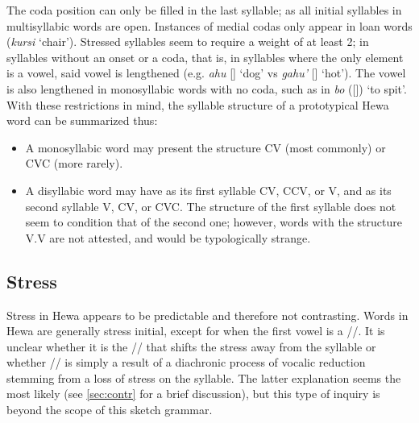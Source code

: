 \documentclass[../hewa_main-subfiles.tex]{subfiles}
\begin{document}
The coda position can only be filled in the last syllable; as all initial syllables in multisyllabic words are open. Instances of medial codas only appear in loan words (\textit{kursi} `chair'). Stressed syllables seem to require a weight of at least 2; in syllables without an onset or a coda, that is, in syllables where the only element is a vowel, said vowel is lengthened (e.g. \textit{ahu} [] `dog' vs \textit{gahu'} [] `hot'). The vowel is also lengthened in monosyllabic words with no coda, such as in  \textit{bo} ([]) `to spit'. With these restrictions in mind, the syllable structure of a prototypical Hewa word can be summarized thus:

\begin{itemize}

\item A monosyllabic word may present the structure CV\textipa{:} (most commonly) or CVC (more rarely).

\item A disyllabic word may have as its first syllable CV, CCV, or V\textlengthmark , and as its second syllable V, CV, or CVC. The structure of the first syllable does not seem to condition that of the second one; however, words with the structure V\textlengthmark .V are not attested, and would be typologically strange.

\end{itemize}

\subsection{Stress}\label{sec:str}


Stress in Hewa appears to be predictable and therefore not contrasting. Words in Hewa are generally stress initial, except for when the first vowel is a /\textschwa/. It is unclear whether it is the /\textschwa/ that shifts the stress away from the syllable or whether /\textschwa/ is simply a result of a diachronic process of vocalic reduction stemming from a loss of stress on the syllable. The latter explanation seems the most likely (see \ref{sec:contr} for a brief discussion), but this type of inquiry is beyond the scope of this sketch grammar.
\end{document}
